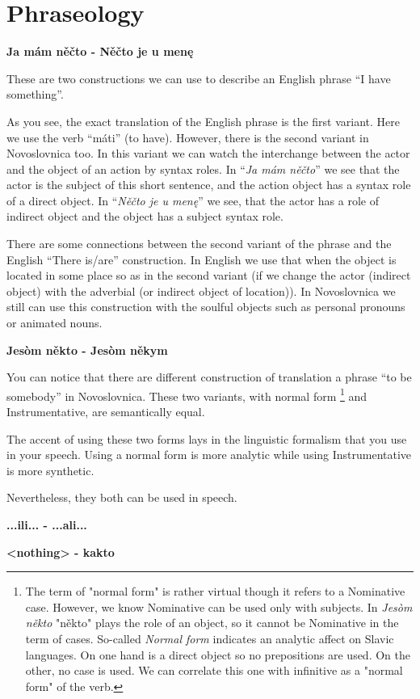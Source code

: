 \section{Phraseology}

\textbf{Ja mám něčto - Něčto je u menę}

These are two constructions we can use to describe an English phrase “I have something”.

As you see, the exact translation of the English phrase is the first variant. Here we use the verb “máti” (to have). However, there is the second variant in Novoslovnica too. In this variant we can watch the interchange between the actor and the object of an action by syntax roles. In “\textit{Ja mám něčto}” we see that the actor is the subject of this short sentence, and the action object has a syntax role of a direct object. In “\textit{Něčto je u menę}” we see, that the actor has a role of indirect object and the object has a subject syntax role.    

There are some connections between the second variant of the phrase and the English “There is/are” construction. In English we use that when the object is located in some place so as in the second variant (if we change the actor (indirect object) with the adverbial (or indirect object of location)). In Novoslovnica we still can use this construction with the soulful objects such as personal pronouns or animated nouns. 

\textbf{Jesòm někto - Jesòm někym}

You can notice that there are different construction of translation a phrase “to be somebody” in Novoslovnica. These two variants, with normal form \footnote{The term of "normal form" is rather virtual though it refers to a Nominative case. However, we know Nominative can be used only with subjects. In \textit{Jesòm někto} "někto" plays the role of an object, so it cannot be Nominative in the term of cases. So-called \textit{Normal form} indicates an analytic affect on Slavic languages. On one hand is a direct object so no prepositions are used. On the other, no case is used. We can correlate this one with infinitive as a "normal form" of the verb.} and Instrumentative, are semantically equal. 

The accent of using these two forms lays in the linguistic formalism that you use in your speech. Using a normal form is more analytic while using Instrumentative is more synthetic.

Nevertheless, they both can be used in speech.


\textbf{...ili... - ...ali...}

\textbf{<nothing> - kakto}

